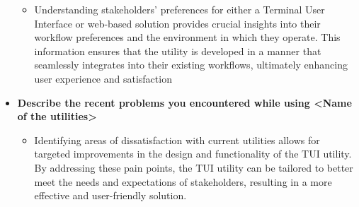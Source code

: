 \documentclass[10pt , a4paper]{report}
\begin{document}
\begin{itemize}
        \begin{itemize}
            \item Understanding stakeholders' preferences for either a Terminal User Interface or web-based solution provides crucial insights into their workflow preferences and the environment in which they operate. This information ensures that the utility is developed in a manner that seamlessly integrates into their existing workflows, ultimately enhancing user experience and satisfaction
        \end{itemize}
    \item \textbf{Describe the recent problems you encountered while using <Name of the utilities>}
        \begin{itemize}
            \item Identifying areas of dissatisfaction with current utilities allows for targeted improvements in the design and functionality of the TUI utility. By addressing these pain points, the TUI utility can be tailored to better meet the needs and expectations of stakeholders, resulting in a more effective and user-friendly solution.
        \end{itemize}
        

\end{itemize}
\end{document}
